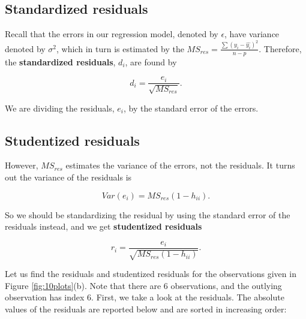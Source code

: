 \documentclass[
]{book}
\newenvironment{Shaded}{\begin{snugshade}}{\end{snugshade}}
\newcommand{\DocumentationTok}[1]{\textcolor[rgb]{0.56,0.35,0.01}{\textbf{\textit{#1}}}}
\newcommand{\FunctionTok}[1]{\textcolor[rgb]{0.13,0.29,0.53}{\textbf{#1}}}
\newcommand{\NormalTok}[1]{#1}
\newcommand{\SpecialCharTok}[1]{\textcolor[rgb]{0.81,0.36,0.00}{\textbf{#1}}}
\begin{document}
\hypertarget{standardized-residuals}{%
\subsection{Standardized residuals}\label{standardized-residuals}}

Recall that the errors in our regression model, denoted by \(\epsilon\), have variance denoted by \(\sigma^2\), which in turn is estimated by the \(MS_{res} = \frac{\sum(y_i - \hat{y_i})^2}{n-p}\). Therefore, the \textbf{standardized residuals}, \(d_i\), are found by

\begin{equation} 
d_{i} = \frac{e_i}{\sqrt{MS_{res}}}.
\label{eq:10di}
\end{equation}

We are dividing the residuals, \(e_i\), by the standard error of the errors.

\hypertarget{studentized-residuals}{%
\subsection{Studentized residuals}\label{studentized-residuals}}

However, \(MS_{res}\) estimates the variance of the errors, not the residuals. It turns out the variance of the residuals is

\begin{equation}
Var (e_i) = MS_{res}(1-h_{ii}).
\label{eq:10var}
\end{equation}

So we should be standardizing the residual by using the standard error of the residuals instead, and we get \textbf{studentized residuals}

\begin{equation}
r_i = \frac{e_i}{\sqrt{MS_{res}(1-h_{ii})}}.
\label{eq:10ri}
\end{equation}

Let us find the residuals and studentized residuals for the observations given in Figure \ref{fig:10plots}(b). Note that there are 6 observations, and the outlying observation has index 6. First, we take a look at the residuals. The absolute values of the residuals are reported below and are sorted in increasing order:

\begin{Shaded}
\end{Shaded}
\end{document}
